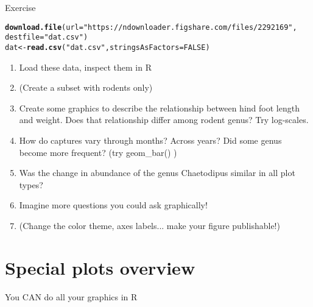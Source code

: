 \documentclass[10pt]{beamer}\usepackage[]{graphicx}\usepackage[]{color}
\makeatletter
\newcommand{\hlnum}[1]{\textcolor[rgb]{0.686,0.059,0.569}{#1}}%
\newcommand{\hlstr}[1]{\textcolor[rgb]{0.192,0.494,0.8}{#1}}%
\newcommand{\hlstd}[1]{\textcolor[rgb]{0.345,0.345,0.345}{#1}}%
\newcommand{\hlkwb}[1]{\textcolor[rgb]{0.69,0.353,0.396}{#1}}%
\newcommand{\hlkwc}[1]{\textcolor[rgb]{0.333,0.667,0.333}{#1}}%
\newcommand{\hlkwd}[1]{\textcolor[rgb]{0.737,0.353,0.396}{\textbf{#1}}}%
\newenvironment{kframe}{%
 \def\at@end@of@kframe{}%
 \ifinner\ifhmode%
  \def\at@end@of@kframe{\end{minipage}}%
  \begin{minipage}{\columnwidth}%
 \fi\fi%
 \def\FrameCommand##1{\hskip\@totalleftmargin \hskip-\fboxsep
 \colorbox{shadecolor}{##1}\hskip-\fboxsep
     \hskip-\linewidth \hskip-\@totalleftmargin \hskip\columnwidth}%
 \MakeFramed {\advance\hsize-\width
   \@totalleftmargin\z@ \linewidth\hsize
   \@setminipage}}%
 {\par\unskip\endMakeFramed%
 \at@end@of@kframe}
\newenvironment{knitrout}{}{} %
\makeatother
\begin{document}
\begin{frame}[fragile]{Exercise}

\small
\begin{knitrout}
\color{fgcolor}\begin{kframe}
\begin{alltt}
\hlkwd{download.file}\hlstd{(}\hlkwc{url}\hlstd{=}\hlstr{"https://ndownloader.figshare.com/files/2292169"}\hlstd{,}
              \hlkwc{destfile} \hlstd{=} \hlstr{"dat.csv"}\hlstd{)}
\hlstd{dat}\hlkwb{<-} \hlkwd{read.csv}\hlstd{(}\hlstr{"dat.csv"}\hlstd{,} \hlkwc{stringsAsFactors} \hlstd{=} \hlnum{FALSE}\hlstd{)}
\end{alltt}
\end{kframe}
\end{knitrout}

\begin{enumerate}
  \item Load these data, inspect them in R
  \item (Create a subset with rodents only)
  \item Create some graphics to describe the relationship between hind foot length and weight. Does that relationship differ among rodent genus? Try log-scales.
  \pause
  \item How do captures vary through months? Across years? Did some genus become more frequent? (try geom\_bar() ) 
  \pause
  \item Was the change in abundance of the genus Chaetodipus similar in all plot types?
  \item Imagine more questions you could ask graphically!
  \item (Change the color theme, axes labels... make your figure publishable!)
\end{enumerate}



\end{frame}


\section{Special plots overview}

\begin{frame}[standout]{}
\Large
\alert{You CAN do all your graphics in R}

\end{frame}
\end{document}
